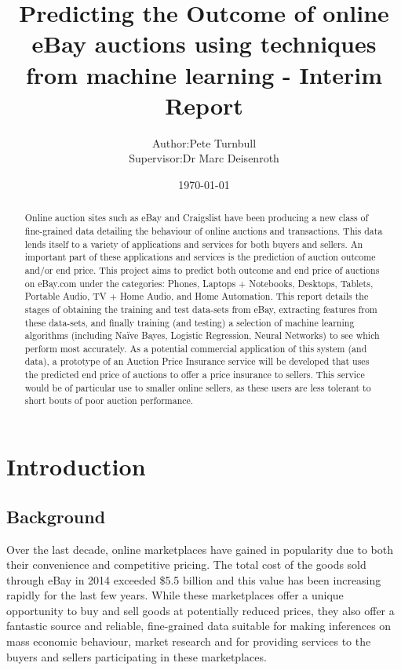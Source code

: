 \documentclass[12pt]{article}
\title{Predicting the Outcome of online eBay auctions using techniques from machine learning - Interim Report}
\author{\begin{tabular}{r@{ }l} 
Author:      & Pete Turnbull \\[1ex]
Supervisor: & Dr Marc Deisenroth
\end{tabular}}
\date{\today}
\begin{document}
\maketitle

\begin{abstract}
Online auction sites such as eBay and Craigslist have been producing a new class of fine-grained data detailing the behaviour of online auctions and transactions. This data lends itself to a variety of applications and services for both buyers and sellers. An important part of these applications and services is the prediction of auction outcome and/or end price.
This project aims to predict both outcome and end price of auctions on eBay.com under the categories: Phones, Laptops + Notebooks, Desktops, Tablets, Portable Audio, TV + Home Audio, and Home Automation.  This report details the stages of obtaining the training and test data-sets from eBay, extracting features from these data-sets, and finally training (and testing) a selection of machine learning algorithms (including Naïve Bayes, Logistic Regression, Neural Networks) to see which perform most accurately.
As a potential commercial application of this system (and data), a prototype of an Auction Price Insurance service will be developed that uses the predicted end price of auctions to offer a price insurance to sellers. This service would be of particular use to smaller online sellers, as these users are less tolerant to short bouts of poor auction performance.
\end{abstract}

\newpage

\tableofcontents

\newpage

\section{Introduction}

\subsection{Background}

Over the last decade, online marketplaces have gained in popularity due to both their convenience and competitive pricing. The total cost of the goods sold through eBay in 2014 exceeded \$5.5 billion and this value has been increasing rapidly for the last few years. While these marketplaces offer a unique opportunity to buy and sell goods at potentially reduced prices, they also offer a fantastic source and reliable, fine-grained data suitable for making inferences on mass economic behaviour, market research and for providing services to the buyers and sellers participating in these marketplaces.
\end{document}
